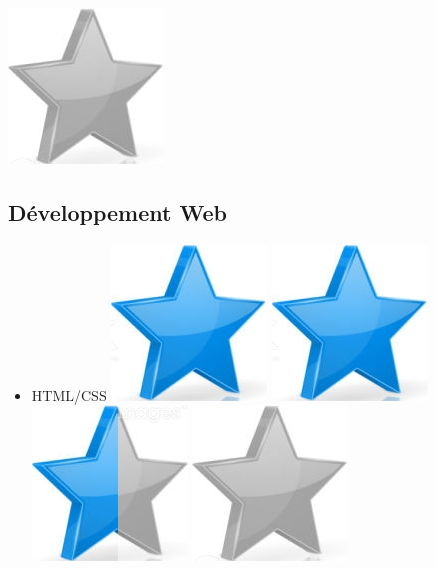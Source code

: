 \documentclass[10pt,a4paper,sans]{article}
\begin{document}
\begin{minipage}[t]{0.28\textwidth}
\begin{mdframed}[style=cadreCompetences]
\begin{itemize}
{                    \includegraphics[scale=0.25]{img/empty_star.png}}
            \end{itemize}
        \subsection{Développement Web}
            \begin{itemize}
                \item{HTML/CSS
                    \hfill
                    \includegraphics[scale=0.25]{img/star.png} \hspace{-0.22cm}
                    \includegraphics[scale=0.25]{img/star.png} \hspace{-0.22cm}
                    \includegraphics[scale=0.25]{img/half_star.png} \hspace{-0.22cm}
                    \includegraphics[scale=0.25]{img/empty_star.png} \hspace{-0.22cm}
}
\end{itemize}
\end{mdframed}
\end{minipage}
\end{document}

